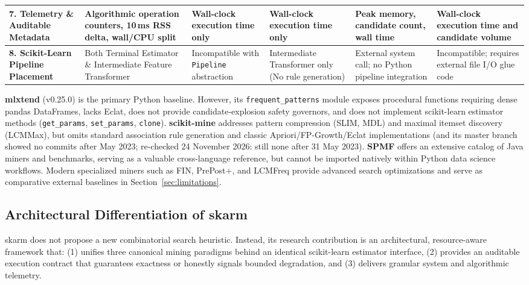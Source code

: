 \documentclass[twocolumn,10pt]{article}
\newcommand{\skarm}{\textsf{skarm}\xspace}
\begin{document}
\begin{table}[t]
\begin{tabular}{p{2.6cm}p{2.5cm}p{2.4cm}p{2.4cm}p{2.4cm}p{2.6cm}}
\midrule
\textbf{7. Telemetry \& Auditable Metadata} & Algorithmic operation counters, 10\,ms RSS delta, wall/CPU split & Wall-clock execution time only & Wall-clock execution time only & Peak memory, candidate count, wall time & Wall-clock execution time and candidate volume \\
\midrule
\textbf{8. Scikit-Learn Pipeline Placement} & Both Terminal Estimator \& Intermediate Feature Transformer & Incompatible with \texttt{Pipeline} abstraction & Intermediate Transformer only (No rule generation) & External system call; no Python pipeline integration & Incompatible; requires external file I/O glue code \\
\bottomrule
\end{tabular}
\end{table}

\textbf{mlxtend} (v0.25.0) \cite{mlxtend} is the primary Python baseline. However, its \texttt{frequent\_patterns} module exposes procedural functions requiring dense pandas DataFrames, lacks Eclat, does not provide candidate-explosion safety governors, and does not implement scikit-learn estimator methods (\texttt{get\_params}, \texttt{set\_params}, \texttt{clone}). \textbf{scikit-mine} \cite{scikitmine} addresses pattern compression (SLIM, MDL) and maximal itemset discovery (LCMMax), but omits standard association rule generation and classic Apriori/FP-Growth/Eclat implementations (and its master branch showed no commits after May 2023; re-checked 24 November 2026: still none after 31 May 2023). \textbf{SPMF} \cite{spmf} offers an extensive catalog of Java miners and benchmarks, serving as a valuable cross-language reference, but cannot be imported natively within Python data science workflows. Modern specialized miners such as FIN, PrePost+, and LCMFreq \cite{kallay2025} provide advanced search optimizations and serve as comparative external baselines in Section~\ref{sec:limitations}.

\subsection{Architectural Differentiation of \skarm}
\skarm does not propose a new combinatorial search heuristic. Instead, its research contribution is an architectural, resource-aware framework that: (1) unifies three canonical mining paradigms behind an identical scikit-learn estimator interface, (2) provides an auditable execution contract that guarantees exactness or honestly signals bounded degradation, and (3) delivers granular system and algorithmic telemetry.
\end{document}
